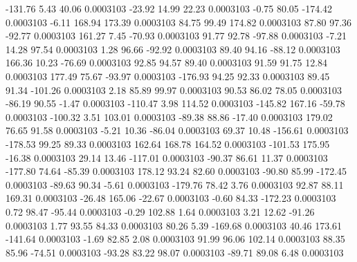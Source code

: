      -131.76        5.43       40.06     0.0003103
      -23.92       14.99       22.23     0.0003103
       -0.75       80.05     -174.42     0.0003103
       -6.11      168.94      173.39     0.0003103
       84.75       99.49      174.82     0.0003103
       87.80       97.36      -92.77     0.0003103
      161.27        7.45      -70.93     0.0003103
       91.77       92.78      -97.88     0.0003103
       -7.21       14.28       97.54     0.0003103
        1.28       96.66      -92.92     0.0003103
       89.40       94.16      -88.12     0.0003103
      166.36       10.23      -76.69     0.0003103
       92.85       94.57       89.40     0.0003103
       91.59       91.75       12.84     0.0003103
      177.49       75.67      -93.97     0.0003103
     -176.93       94.25       92.33     0.0003103
       89.45       91.34     -101.26     0.0003103
        2.18       85.89       99.97     0.0003103
       90.53       86.02       78.05     0.0003103
      -86.19       90.55       -1.47     0.0003103
     -110.47        3.98      114.52     0.0003103
     -145.82      167.16      -59.78     0.0003103
     -100.32        3.51      103.01     0.0003103
      -89.38       88.86      -17.40     0.0003103
      179.02       76.65       91.58     0.0003103
       -5.21       10.36      -86.04     0.0003103
       69.37       10.48     -156.61     0.0003103
     -178.53       99.25       89.33     0.0003103
      162.64      168.78      164.52     0.0003103
     -101.53      175.95      -16.38     0.0003103
       29.14       13.46     -117.01     0.0003103
      -90.37       86.61       11.37     0.0003103
     -177.80       74.64      -85.39     0.0003103
      178.12       93.24       82.60     0.0003103
      -90.80       85.99     -172.45     0.0003103
      -89.63       90.34       -5.61     0.0003103
     -179.76       78.42        3.76     0.0003103
       92.87       88.11      169.31     0.0003103
      -26.48      165.06      -22.67     0.0003103
       -0.60       84.33     -172.23     0.0003103
        0.72       98.47      -95.44     0.0003103
       -0.29      102.88        1.64     0.0003103
        3.21       12.62      -91.26     0.0003103
        1.77       93.55       84.33     0.0003103
       80.26        5.39     -169.68     0.0003103
       40.46      173.61     -141.64     0.0003103
       -1.69       82.85        2.08     0.0003103
       91.99       96.06      102.14     0.0003103
       88.35       85.96      -74.51     0.0003103
      -93.28       83.22       98.07     0.0003103
      -89.71       89.08        6.48     0.0003103

